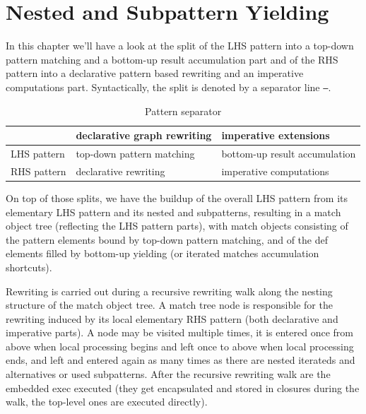 \chapter{Nested and Subpattern Yielding}%
\label{cha:yielding}

In this chapter we'll have a look at the split of the LHS pattern 
into a top-down pattern matching and a bottom-up result accumulation part
and of the RHS pattern
into a declarative pattern based rewriting and an imperative computations part.
Syntactically, the split is denoted by a separator line \texttt{---}.

\begin{table}[htbp]
  \centering
  \begin{tabularx}{\linewidth}{|l|X|X|} 
		\hline
     & declarative graph rewriting & imperative extensions \\
		\hline
    LHS pattern & top-down pattern matching & bottom-up result accumulation \\
		\hline
    RHS pattern & declarative rewriting & imperative computations \\
		\hline
  \end{tabularx}
  \caption{Pattern separator}
  \label{patternsepar}
\end{table}

On top of those splits, we have the buildup of the overall LHS pattern from its elementary LHS pattern and its nested and subpatterns,
resulting in a match object tree (reflecting the LHS pattern parts),
with match objects consisting of the pattern elements bound by top-down pattern matching,
and of the def elements filled by bottom-up yielding (or iterated matches accumulation shortcuts).

Rewriting is carried out during a recursive rewriting walk along the nesting structure of the match object tree.
A match tree node is responsible for the rewriting induced by its local elementary RHS pattern (both declarative and imperative parts).
A node may be visited multiple times, it is entered once from above when local processing begins and left once to above when local processing ends, 
and left and entered again as many times as there are nested iterateds and alternatives or used subpatterns.
After the recursive rewriting walk are the embedded exec executed (they get encapsulated and stored in closures during the walk, the top-level ones are executed directly).

